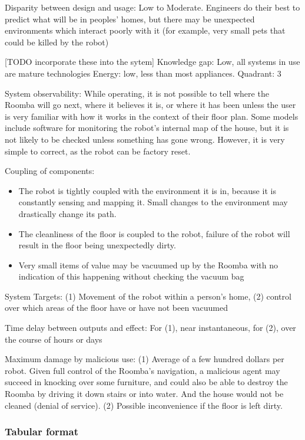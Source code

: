 \documentclass[11pt]{article}
\begin{document}
Disparity between design and usage: Low to Moderate. Engineers do their best to predict what will be
in peoples' homes, but there may be unexpected environments which interact poorly with it (for
example, very small pets that could be killed by the robot)

[TODO incorporate these into the sytem]
Knowledge gap: Low, all systems in use are mature technologies
Energy: low, less than most appliances.
Quadrant: 3

System observability: While operating, it is not possible to tell where the Roomba will go next,
where it believes it is, or where it has been unless the user is very familiar with how it works in
the context of their floor plan. Some models include software for monitoring the robot's internal
map of the house, but it is not likely to be checked unless something has gone wrong. However, it is
very simple to correct, as the robot can be factory reset.

Coupling of components: 
\begin{itemize}
\item The robot is tightly coupled with the environment it is in, because it is constantly sensing
and mapping it. Small changes to the environment may drastically change its path. 
\item The cleanliness of the floor is coupled to the robot, failure of the robot will result in the
floor being unexpectedly dirty.
\item Very small items of value may be vacuumed up by the Roomba with no indication of this
happening without checking the vacuum bag
\end{itemize}

System Targets: (1) Movement of the robot within a person's home, (2) control over which areas of
the floor have or have not been vacuumed

Time delay between outputs and effect: For (1), near instantaneous, for (2), over the course of
hours or days

Maximum damage by malicious use: 
(1) Average of a few hundred dollars per robot. Given full control of
the Roomba's navigation, a malicious agent may succeed in knocking over some furniture, and could
also be able to destroy the Roomba by driving it down stairs or into water. And the house would not
be cleaned (denial of service).
(2) Possible inconvenience if the floor is left dirty. 

\subsubsection{Tabular format}
\end{document}
